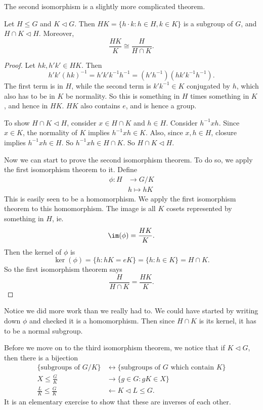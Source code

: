 \documentclass[a4paper]{article}
\begin{document}
The second isomorphism is a slightly more complicated theorem.
\begin{thm}
  Let $H \leq G$ and $K \lhd G$. Then $HK = \{h\cdot k: h \in H, k \in K\}$ is a subgroup of $G$, and $H\cap K \lhd H$. Moreover,
  \[
    \frac{HK}{K} \cong \frac{H}{H \cap K}.
  \]
\end{thm}

\begin{proof}
  Let $hk, h'k' \in HK$. Then
  \[
    h'k'(hk)^{-1} = h'k' k^{-1}h^{-1} = (h'h^{-1})(hk'k^{-1}h^{-1}).
  \]
  The first term is in $H$, while the second term is $k'k^{-1} \in K$ conjugated by $h$, which also has to be in $K$ be normality. So this is something in $H$ times something in $K$, and hence in $HK$. $HK$ also contains $e$, and is hence a group.

  To show $H \cap K \lhd H$, consider $x \in H\cap K$ and $h \in H$. Consider $h^{-1} x h$. Since $x \in K$, the normality of $K$ implies $h^{-1}xh \in K$. Also, since $x, h \in H$, closure implies $h^{-1}xh \in H$. So $h^{-1} x h \in H \cap K$. So $H \cap K \lhd H$.

  Now we can start to prove the second isomorphism theorem. To do so, we apply the first isomorphism theorem to it. Define
  \begin{align*}
    \phi: H &\to G/K\\
    &h \mapsto hK
  \end{align*}
  This is easily seen to be a homomorphism. We apply the first isomorphism theorem to this homomorphism. The image is all $K$ cosets represented by something in $H$, ie.
  \[
    \im (\phi) = \frac{HK}{K}.
  \]
  Then the kernel of $\phi$ is
  \[
    \ker(\phi) = \{h: hK = eK\} = \{h: h \in K\} = H \cap K.
  \]
  So the first isomorphism theorem says
  \[
    \frac{H}{H \cap K} = \frac{HK}{K}.
  \]
\end{proof}
Notice we did more work than we really had to. We could have started by writing down $\phi$ and checked it is a homomorphism. Then since $H \cap K$ is its kernel, it has to be a normal subgroup.

Before we move on to the third isomorphism theorem, we notice that if $K \lhd G$, then there is a bijection
\begin{align*}
  \{\text{subgroups of }G/K\} &\longleftrightarrow\{\text{subgroups of }G\text{ which contain }K\}\\
  X \leq \frac{G}{K} &\longrightarrow \{g \in G: gK \in X\}\\
  \frac{L}{K} \leq \frac{G}{K} &\longleftarrow K \lhd L \leq G.
\end{align*}
It is an elementary exercise to show that these are inverses of each other.
\end{document}
